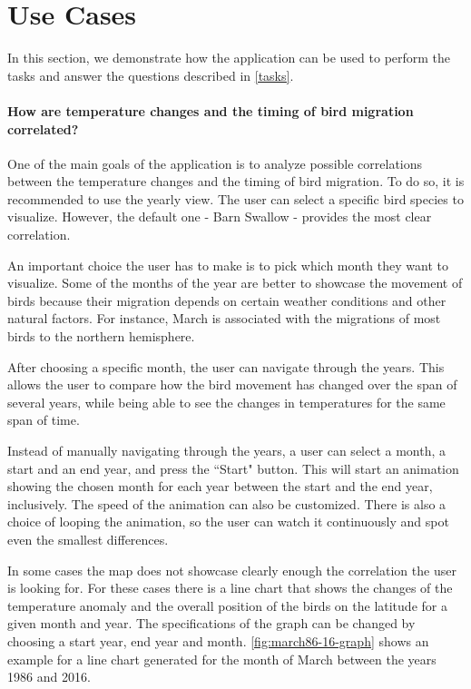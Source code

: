 \documentclass[journal]{vgtc}                %
\begin{document}

\section{Use Cases}

In this section, we demonstrate how the application can be used to perform the tasks and answer the questions described in \autoref{tasks}.

\paragraph{How are temperature changes and the timing of bird migration correlated?}

One of the main goals of the application is to analyze possible correlations between the temperature changes and the timing of bird migration. To do so, it is recommended to use the yearly view. The user can select a specific bird species to visualize. However, the default one - Barn Swallow - provides the most clear correlation.

An important choice the user has to make is to pick which month they want to visualize. Some of the months of the year are better to showcase the movement of birds because their migration depends on certain weather conditions and other natural factors. For instance, March is associated with the migrations of most birds to the northern hemisphere.

After choosing a specific month, the user can navigate through the years. This allows the user to compare how the bird movement has changed over the span of several years, while being able to see the changes in temperatures for the same span of time.

Instead of manually navigating through the years, a user can select a month, a start and an end year, and press the ``Start" button. This will start an animation showing the chosen month for each year between the start and the end year, inclusively. The speed of the animation can also be customized. There is also a choice of looping the animation, so the user can watch it continuously and spot even the smallest differences.

In some cases the map does not showcase clearly enough the correlation the user is looking for. For these cases there is a line chart that shows the changes of the temperature anomaly and the overall position of the birds on the latitude for a given month and year. The specifications of the graph can be changed by choosing a start year, end year and month. \autoref{fig:march86-16-graph} shows an example for a line chart generated for the month of March between the years 1986 and 2016.
\end{document}
